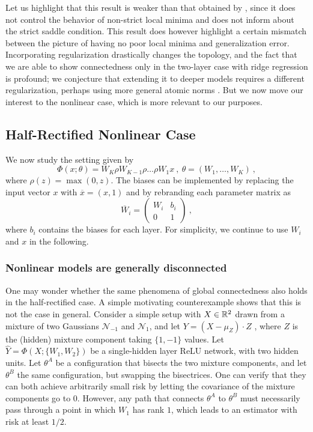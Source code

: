 Let us highlight that this result is weaker than that obtained by \cite{kawaguchi2016deep}, since it does not 
control the behavior of non-strict local minima and does not inform about the strict saddle condition. 
This result does however highlight a certain mismatch between the picture of having no poor local minima 
and generalization error. Incorporating regularization drastically changes the topology, and the 
fact that we are able to show connectedness only in the two-layer case with ridge regression is profound; we conjecture that extending it to deeper models requires a different regularization, perhaps using more general atomic norms \cite{bach2013convex}. But we now move our interest to the nonlinear case, which is more relevant to our purposes. 

\subsection{Half-Rectified Nonlinear Case}

We now study the setting given by 
\begin{equation}
\label{relucase}
\Phi(x;\theta) = W_K \rho W_{K-1} \rho \dots \rho W_1 x~,~\theta = (W_1, \dots, W_K)~,
\end{equation}
where $\rho(z) = \max(0 ,z)$. 
The biases can be implemented by replacing the input vector $x$ 
with $\overline{x}=(x, 1)$ and by rebranding each parameter matrix as 
$$\overline{W}_i = \left( 
\begin{array}{c|c}
W_i & b_i \\
\hline 
0 & 1 
\end{array}
\right)~,$$
where $b_i$ contains the biases for each layer.	
For simplicity, we continue to use $W_i$ and $x$ in the following.

\subsubsection{Nonlinear models are generally disconnected}
\label{disconnect}

One may wonder whether the same phenomena of global connectedness also holds 
in the half-rectified case. A simple motivating counterexample shows that this is not the case in 
general. Consider a simple setup with $X \in {\mathbb{R}}^2$ drawn from a mixture of two Gaussians $\mathcal{N}_{-1}$ 
and $\mathcal{N}_{1}$, and let $Y = (X-\mu_Z) \cdot Z $ , where $Z$ is the (hidden) mixture component taking $\{1,-1\}$ values.  Let 
$\hat{Y} = \Phi(X; \{ W_1, W_2\} )$ be a single-hidden layer ReLU network, with two hidden units. 
Let $\theta^A$ be a configuration that bisects the two mixture components, 
and let $\theta^B$ the same configuration, but swapping the bisectrices. 
One can verify that they can both achieve arbitrarily small risk by letting the covariance of the mixture components go to $0$. 
However, any path that connects $\theta^A$ to $\theta^B$ 
must necessarily pass through a point in which $W_1$ has rank $1$, which leads to an estimator with risk at least $1/2$.  

